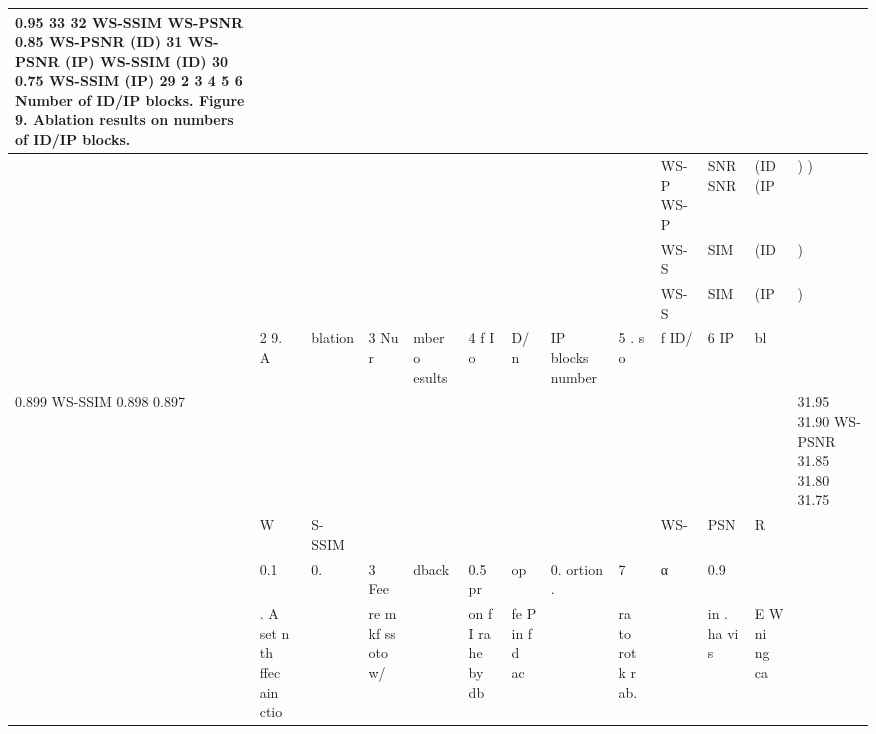 \begin{tabular}{lllllllllllll}
\toprule
0.95 33 32 WS-SSIM WS-PSNR 0.85 WS-PSNR (ID) 31 WS-PSNR (IP) WS-SSIM (ID) 30 0.75 WS-SSIM (IP) 29 2 3 4 5 6 Number of ID/IP blocks. Figure 9. Ablation results on numbers of ID/IP blocks. &  &  &  &  &  &  &  &  &  &  &  &  \\
\midrule
 &  &  &  &  &  &  &  &  & WS-P WS-P & SNR SNR & (ID (IP & ) ) \\
 &  &  &  &  &  &  &  &  & WS-S & SIM & (ID & ) \\
 &  &  &  &  &  &  &  &  & WS-S & SIM & (IP & ) \\
 & 2 9. A & blation & 3 Nu r & mber o esults & 4 f I o & D/ n & IP blocks number & 5 . s o & f ID/ & 6 IP & bl &  \\
0.899 WS-SSIM 0.898 0.897 &  &  &  &  &  &  &  &  &  &  &  & 31.95 31.90 WS-PSNR 31.85 31.80 31.75 \\
 & W & S-SSIM &  &  &  &  &  &  & WS- & PSN & R &  \\
 & 0.1 & 0. & 3 Fee & dback & 0.5 pr & op & 0. ortion . & 7 & α & 0.9 &  &  \\
 & . A set n th ffec ain ctio &  & re m kf ss oto w/ &  & on f I ra he by db & fe P in f d ac &  & ra to rot k r ab. &  & in . ha vi s & E W ni ng ca &  \\
\bottomrule
\end{tabular}
